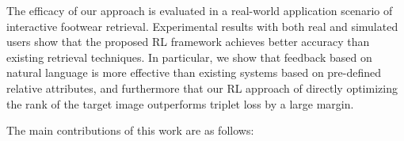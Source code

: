 The efficacy of our approach is evaluated in a real-world application
scenario of interactive footwear retrieval. Experimental results with both real and simulated users show that the proposed RL
framework achieves better accuracy than existing retrieval techniques. 
In particular, we show that feedback based on natural language is more effective than existing 
systems based on pre-defined relative attributes, and furthermore that our RL approach of 
directly optimizing the rank of the target image outperforms triplet loss by a large margin. 

The main contributions of this work are as follows:



